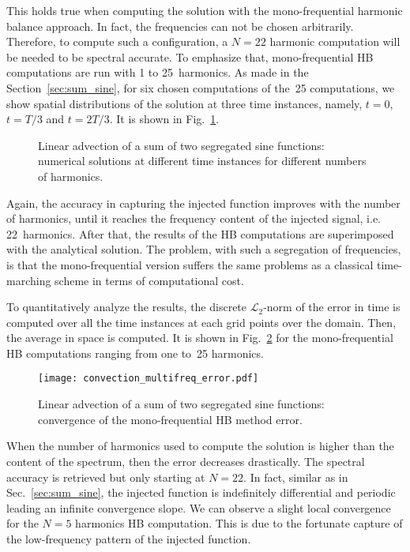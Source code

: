This holds true when computing the solution with the mono-frequential
harmonic balance approach. In fact, the frequencies can not be chosen arbitrarily.
Therefore, to compute such a configuration, a $N=22$ harmonic computation
will be needed to be spectral accurate. To emphasize that, mono-frequential
HB computations are run with 1 to 25~harmonics.
As made in the Section~\ref{sec:sum_sine}, 
for six chosen computations of the~25 computations, 
we show spatial distributions of the solution
at three time instances, namely, $t=0$, $t=T/3$ and $t=2T/3$.
It is shown in Fig.~\ref{fig:inj_multifreq_tsm}.
\begin{figure}
  \centering
  \caption{Linear advection of a sum of two segregated sine functions: 
  numerical solutions at different time instances for different numbers of harmonics.}
  \label{fig:inj_multifreq_tsm}
\end{figure}
Again, the accuracy in capturing the injected function
improves with the number of harmonics,
until it reaches the frequency content
of the injected signal, i.e. 22~harmonics.
After that, the results of the HB computations are
superimposed with the analytical solution. 
The problem, with such a segregation of frequencies, is that 
the mono-frequential version suffers the same
problems as a classical time-marching scheme in terms of 
computational cost.

To quantitatively analyze the results,
the discrete $\mathcal{L}_2$-norm of the error 
in time is computed over all the time instances
at each grid points over the domain.
Then, the average in space is computed.
It is shown in Fig.~\ref{fig:conv_multifreq_tsm} for the
mono-frequential HB computations ranging from one to~25
harmonics.
\begin{figure}
  \centering
  \texttt{[image: convection\_multifreq\_error.pdf]}
  \caption{Linear advection of a sum of two segregated sine functions: convergence of the mono-frequential HB method error.}
  \label{fig:conv_multifreq_tsm}
\end{figure}
When the number of harmonics
used to compute the solution is higher than the content of the spectrum,
then the error decreases drastically. The spectral accuracy is retrieved
but only starting at $N=22$.
In fact, similar as in Sec.~\ref{sec:sum_sine},
the injected function is indefinitely differential and periodic
leading an infinite convergence slope. We can observe a slight local convergence
for the $N=5$ harmonics HB computation. This is due to the fortunate 
capture of the low-frequency pattern of the injected function.

